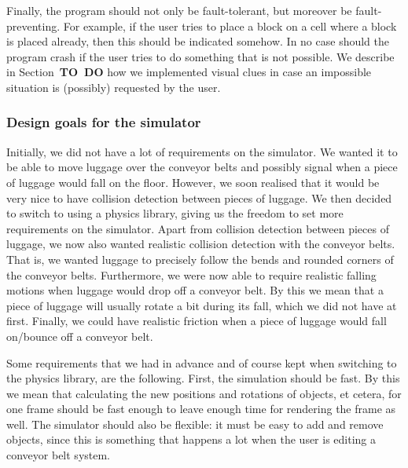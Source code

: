 Finally, the program should not only be fault-tolerant, but moreover be fault-preventing. For example, if the user tries to place a block on a cell where a block is placed already, then this should be indicated somehow. In no case should the program crash if the user tries to do something that is not possible. We describe in Section~\textbf{TO~DO} how we implemented visual clues in case an impossible situation is (possibly) requested by the user.

\subsubsection{Design goals for the simulator}
Initially, we did not have a lot of requirements on the simulator. We wanted it to be able to move luggage over the conveyor belts and possibly signal when a piece of luggage would fall on the floor. However, we soon realised that it would be very nice to have collision detection between pieces of luggage. We then decided to switch to using a physics library, giving us the freedom to set more requirements on the simulator. Apart from collision detection between pieces of luggage, we now also wanted realistic collision detection with the conveyor belts. That is, we wanted luggage to precisely follow the bends and rounded corners of the conveyor belts. Furthermore, we were now able to require realistic falling motions when luggage would drop off a conveyor belt. By this we mean that a piece of luggage will usually rotate a bit during its fall, which we did not have at first. Finally, we could have realistic friction when a piece of luggage would fall on/bounce off a conveyor belt.

Some requirements that we had in advance and of course kept when switching to the physics library, are the following. First, the simulation should be fast. By this we mean that calculating the new positions and rotations of objects, et cetera, for one frame should be fast enough to leave enough time for rendering the frame as well. The simulator should also be flexible: it must be easy to add and remove objects, since this is something that happens a lot when the user is editing a conveyor belt system.